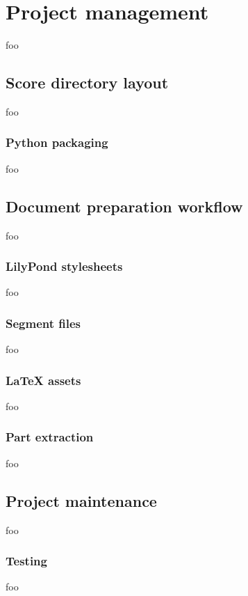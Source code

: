 \chapter{Project management}

foo

\section{Score directory layout}

foo

\subsection{Python packaging}

foo

\section{Document preparation workflow}

foo

\subsection{LilyPond stylesheets}

foo

\subsection{Segment files}

foo

\subsection{LaTeX assets}

foo

\subsection{Part extraction}

foo

\section{Project maintenance}

foo

\subsection{Testing}

foo
